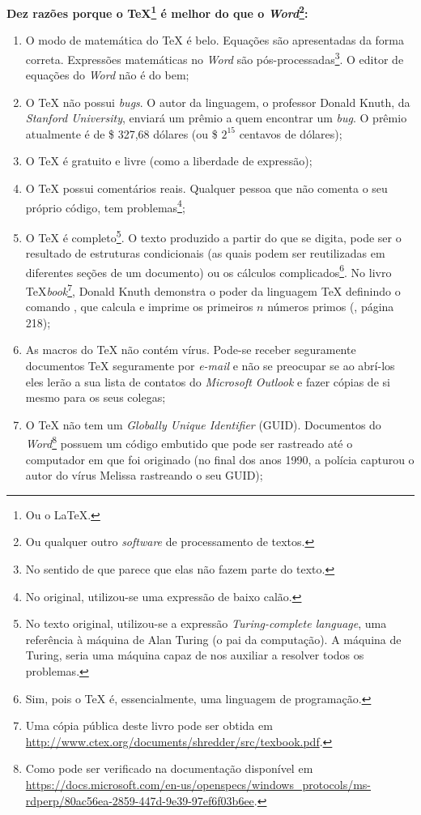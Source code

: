 \textbf{Dez razões porque o \TeX{}\footnote{Ou o \LaTeX{}.} é melhor do que o \textit{Word}\footnote{Ou qualquer outro \textit{software} de processamento de textos.}:}

\begingroup
\renewcommand{\labelenumi}{\arabic{enumi}.}
\begin{enumerate}
    \item O modo de matemática do \TeX{} é belo. Equações são apresentadas da forma correta. Expressões matemáticas no \textit{Word} são pós-processadas\footnote{No sentido de que parece que elas não fazem parte do texto.}. O editor de equações do \textit{Word} não é do bem;
    \item O \TeX{} não possui \textit{bugs}. O autor da linguagem, o professor Donald Knuth, da \textit{Stanford University}, enviará um prêmio a quem encontrar um \textit{bug}. O prêmio atualmente é de \$ 327,68 dólares (ou \$ $2^{15}$ centavos de dólares);
    \item O \TeX{} é gratuito e livre (como a liberdade de expressão);
    \item O \TeX{} possui comentários reais. Qualquer pessoa que não comenta o seu próprio código, tem problemas\footnote{No original, utilizou-se uma expressão de baixo calão.};
    \item O \TeX{} é completo\footnote{No texto original, utilizou-se a expressão \textit{Turing-complete language}, uma referência à máquina de Alan Turing (o pai da computação). A máquina de Turing, seria uma máquina capaz de nos auxiliar a resolver todos os problemas.}. O texto produzido a partir do que se digita, pode ser o resultado de estruturas condicionais (as quais podem ser reutilizadas em diferentes seções de um documento) ou os cálculos complicados\footnote{Sim, pois o \TeX{} é, essencialmente, uma linguagem de programação.}. No livro \TeX \textit{book}\footnote{Uma cópia pública deste livro pode ser obtida em \url{http://www.ctex.org/documents/shredder/src/texbook.pdf}.}, Donald Knuth demonstra o poder da linguagem \TeX{} definindo o comando \texttt{}, que calcula e imprime os primeiros $n$ números primos (, página 218);
    \item As macros do \TeX{} não contém vírus. Pode-se receber seguramente documentos \TeX{} seguramente por \textit{e-mail} e não se preocupar se ao abrí-los eles lerão a sua lista de contatos do \textit{Microsoft Outlook} e fazer cópias de si mesmo para os seus colegas;
    \item O \TeX{} não tem um \textit{Globally Unique Identifier} (GUID). Documentos do \textit{Word}\footnote{Como pode ser verificado na documentação disponível em \url{https://docs.microsoft.com/en-us/openspecs/windows_protocols/ms-rdperp/80ac56ea-2859-447d-9e39-97ef6f03b6ee}.} possuem um código embutido que pode ser rastreado até o computador em que foi originado (no final dos anos 1990, a polícia capturou o autor do vírus Melissa rastreando o seu GUID);

\end{enumerate}
